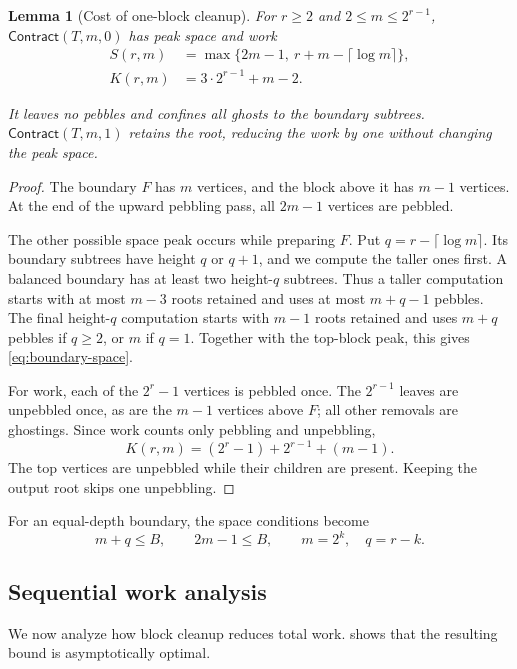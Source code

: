 \documentclass[11pt]{article}
\newtheorem{lemma}[lemma]{Lemma}
\theoremstyle{definition}
\theoremstyle{remark}
\newcommand{\Contract}{\mathsf{Contract}}
\begin{document}
\begin{lemma}[Cost of one-block cleanup]
\label{lem:contract}
For $r\ge2$ and $2\le m\le2^{r-1}$, $\Contract(T,m,0)$ has peak space and work
\begin{align}
 S(r,m)&=\max\{2m-1,\ r+m-\lceil\log m\rceil\}, \label{eq:boundary-space}\\
 K(r,m)&=3\cdot2^{r-1}+m-2. \label{eq:block-work}
\end{align}

It leaves no pebbles and confines all ghosts to the boundary subtrees. $\Contract(T,m,1)$ retains the root, reducing the work by one without changing the peak space.
\end{lemma}

\begin{proof}
The boundary $F$ has $m$ vertices, and the block above it has $m-1$ vertices. At the end of the upward pebbling pass, all $2m-1$ vertices are pebbled.

The other possible space peak occurs while preparing $F$. Put $q=r-\lceil\log m\rceil$. Its boundary subtrees have height $q$ or $q+1$, and we compute the taller ones first. A balanced boundary has at least two height-$q$ subtrees. Thus a taller computation starts with at most $m-3$ roots retained and uses at most $m+q-1$ pebbles. The final height-$q$ computation starts with $m-1$ roots retained and uses $m+q$ pebbles if $q\ge2$, or $m$ if $q=1$. Together with the top-block peak, this gives \cref{eq:boundary-space}.

For work, each of the $2^r-1$ vertices is pebbled once. The $2^{r-1}$ leaves are unpebbled once, as are the $m-1$ vertices above $F$; all other removals are ghostings. Since work counts only pebbling and unpebbling,
\[
 K(r,m)=(2^r-1)+2^{r-1}+(m-1).
\]
The top vertices are unpebbled while their children are present. Keeping the output root skips one unpebbling.
\end{proof}

For an equal-depth boundary, the space conditions become
\begin{equation}
 m+q\le B,\qquad 2m-1\le B,\qquad m=2^k,\quad q=r-k.
 \label{eq:feasible-cut}
\end{equation}

\subsection{Sequential work analysis}
\label{sec:sequential}

We now analyze how block cleanup reduces total work.  shows that the resulting bound is asymptotically optimal.
\end{document}
